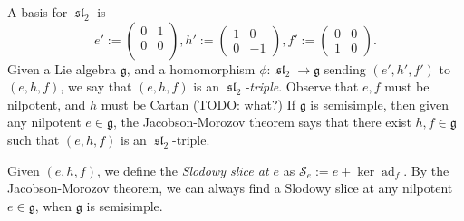 \documentclass[12pt,psamsfonts]{article}
\DeclareMathOperator{\spl}{\mathfrak{sl}}
\DeclareMathOperator{\ad}{ad}
\begin{document}
A basis for \(\spl_2\) is
\[e' := \begin{pmatrix}0 & 1 \\ 0 & 0 \\\end{pmatrix}, h' := \begin{pmatrix}1 & 0 \\0 & -1\end{pmatrix}, f' := \begin{pmatrix}0 & 0 \\1 & 0\end{pmatrix}.\]
Given a Lie algebra \(\mathfrak{g}\), and a homomorphism \(\phi : \spl_2 \to \mathfrak{g}\) sending \((e', h', f')\) to \((e, h, f)\), we say that \((e, h, f)\) is an \emph{\(\spl_2\)-triple}.
Observe that \(e, f\) must be nilpotent, and \(h\) must be Cartan (TODO: what?)
If \(\mathfrak{g}\) is semisimple, then given any nilpotent \(e \in \mathfrak{g}\), the Jacobson-Morozov theorem \cite[3.7.1]{ehf} says that there exist \(h, f \in \mathfrak{g}\) such that \((e, h, f)\) is an \(\spl_2\)-triple.
\par Given \((e, h, f)\), we define the \emph{Slodowy slice at \(e\)} as \(\mathcal{S}_e := e + \ker \ad_f\).
By the Jacobson-Morozov theorem, we can always find a Slodowy slice at any nilpotent \(e \in \mathfrak{g}\), when \(\mathfrak{g}\) is semisimple.
\end{document}
